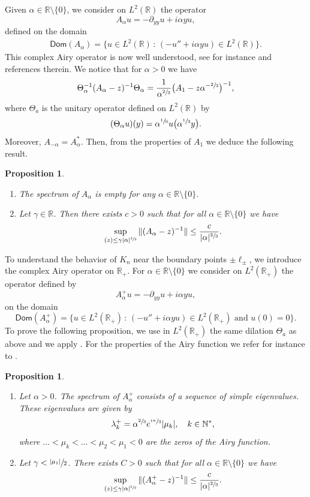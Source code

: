 \documentclass[10pt]{amsart}
\theoremstyle{plain}
\newtheorem{proposition}[theorem]{Proposition}
\theoremstyle{definition}
\newcommand{\abs}[1]{\vert #1\vert}
\newcommand{\nr}[1]{\Vert #1\Vert}
\newcommand{\set}[1]{\{ #1\}}
\newcommand{\bset}[1]{\bigl\{ #1\bigr\}}
\newcommand{\inv}{^{-1}}
\newcommand{\1}{\mathds 1}
\newcommand{\st}{\,:\,}
\let\Re\relax
\DeclareMathOperator{\Re}{\mathsf{Re}\mkern2mu}
\newcommand{\Dom}{\mathsf{Dom}}
\newcommand{\R}{\mathbb{R}}
\newcommand{\N}{\mathbb{N}}
\let\a\alpha
\let\g\gamma
\let\Th\Theta
\let\l\lambda
\let\m\mu
\begin{document}
Given $\a \in \R \setminus \set 0$, we consider on $L^2(\R)$ the operator
\begin{equation} \label{def-Aa}
A_\a u = -\partial_{yy} u + i \a y u,
\end{equation}
defined on the domain
\begin{align*}
\Dom(A_\a) = \set{u \in L^2(\R) \st (-u'' + i \a y u) \in L^2(\R)}.
\end{align*}
This complex Airy operator is now well understood, see for instance \cite{Helffer11,KrejcirikSie15} and references therein. We notice that for $\a > 0$ we have
\[
\Th_\a \inv (A_\a - z)\inv \Th_\a = \frac 1 {\a^{\sfrac 23}} \bigl(A_1 - z \a^{-\sfrac 23} \bigr) \inv,
\]
where $\Th_a$ is the unitary operator defined on $L^2(\R)$ by
\[
(\Th_\a u)(y) = \a^{\sfrac 16} u \bigl(\a^{\sfrac 13} y \bigr).
\]
Moreover, $A_{-\a} = A_\a^*$. Then, from the properties of $A_{1}$ we deduce the following result.

\skpt
\begin{proposition}
\begin{enumerate}
\item The spectrum of $A_\a$ is empty for any $\a \in \R\setminus \set 0$.
\item Let $\gamma \in \R$. Then there exists $c > 0$ such that for all $\a \in \R \setminus \set 0$ we have
\[
\sup_{\Re(z) \leq \g \abs \a^{\sfrac 2 3}} \nr{(A_\a -z)\inv} \leq \frac c {\abs \a^{\sfrac 23}}.
\]
\end{enumerate} \label{prop-Airy-R}
\end{proposition}

To understand the behavior of $K_n$ near the boundary points $\pm \ell_\pm$, we introduce the complex Airy operator on $\R_+$. For $\a \in \R \setminus \set 0$ we consider on $L^2(\R_+)$ the operator defined by
\[
A_\a^+ u = -\partial_{yy} u + i \a y u,
\]
on the domain
\[
\Dom(A_\a^+) = \bset{u \in L^2(\R_+) \st (-u'' + i \a y u) \in L^2(\R_+) \text{ and } u(0) = 0}.
\]
To prove the following proposition, we use in $L^2(\R_+)$ the same dilation $\Th_a$ as above and we apply \cite[Lemma 5.1]{Helffer11}. For the properties of the Airy function we refer for instance to \cite{ValleeSoares}.

\skpt
\begin{proposition}
\begin{enumerate}
\item Let $\a > 0$. The spectrum of $A_\a^+$ consists of a sequence of simple eigenvalues. These eigenvalues are given by
\[
\l_k^+ = \a^{\sfrac 23} e^{\sfrac {i\pi}3} \abs {\m_k}, \quad k \in \N^*,
\]
where $\dots < \mu_k < \dots < \mu_2 < \mu_1 < 0$ are the zeros of the Airy function.
\item Let $\gamma < \sfrac {\abs {\mu_1}} 2$. There exists $C > 0$ such that for all $\a \in \R \setminus \set 0$ we have
\[
\sup_{\Re(z) \leq \g \abs \a^{\sfrac 2 3}} \nr{(A_\a^+ -z)\inv} \leq \frac c {\abs \a^{\sfrac 23}}.
\]
\end{enumerate}\label{prop-Airy-R+}
\end{proposition}
\end{document}
